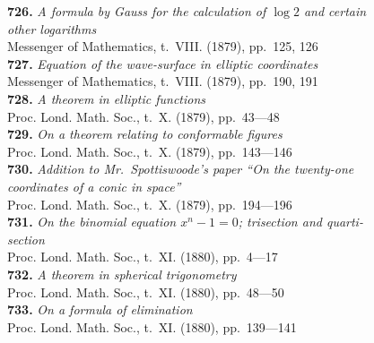 \documentclass[12pt,a4paper,oneside]{book}
\theoremstyle{plain}
\theoremstyle{definition}
\theoremstyle{remark}
\begin{document}
\textbf{726.} \textit{A formula by Gauss for the calculation of $\log 2$ and certain}\\
\hspace*{2em}\textit{other logarithms} \\
\hspace*{2em}Messenger of Mathematics, t.~VIII. (1879), pp.~125, 126\\[0.3em]
\textbf{727.} \textit{Equation of the wave-surface in elliptic coordinates} \\
\hspace*{2em}Messenger of Mathematics, t.~VIII. (1879), pp.~190, 191\\[0.3em]
\textbf{728.} \textit{A theorem in elliptic functions} \\
\hspace*{2em}Proc. Lond. Math. Soc., t.~X. (1879), pp.~43---48\\[0.3em]
\textbf{729.} \textit{On a theorem relating to conformable figures} \\
\hspace*{2em}Proc. Lond. Math. Soc., t.~X. (1879), pp.~143---146\\[0.3em]
\textbf{730.} \textit{Addition to Mr.~Spottiswoode's paper ``On the twenty-one}\\
\hspace*{2em}\textit{coordinates of a conic in space''} \\
\hspace*{2em}Proc. Lond. Math. Soc., t.~X. (1879), pp.~194---196\\[0.3em]
\textbf{731.} \textit{On the binomial equation $x^n - 1 = 0$; trisection and quarti-}\\
\hspace*{2em}\textit{section} \\
\hspace*{2em}Proc. Lond. Math. Soc., t.~XI. (1880), pp.~4---17\\[0.3em]
\textbf{732.} \textit{A theorem in spherical trigonometry} \\
\hspace*{2em}Proc. Lond. Math. Soc., t.~XI. (1880), pp.~48---50\\[0.3em]
\textbf{733.} \textit{On a formula of elimination} \\
\hspace*{2em}Proc. Lond. Math. Soc., t.~XI. (1880), pp.~139---141\\[0.3em]
\end{document}
